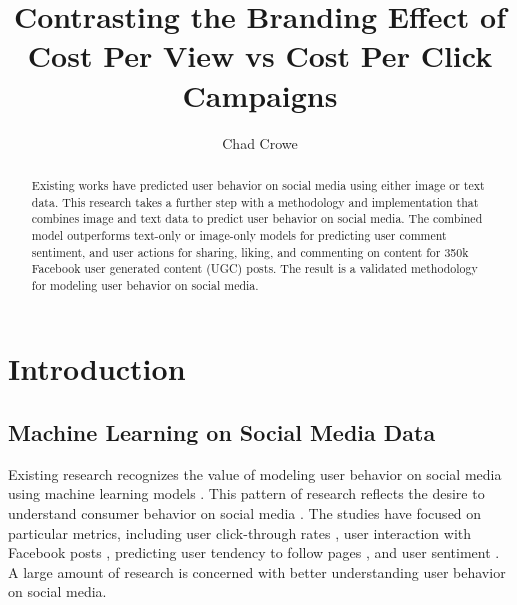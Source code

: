 \documentclass{article}
\begin{document}
\title{Contrasting the Branding Effect of Cost Per View vs Cost Per Click Campaigns}
\author{Chad Crowe}

\maketitle

\begin{abstract}

Existing works have predicted user behavior on social media using either image or text data. This research takes a further step with a methodology and implementation that combines image and text data to predict user behavior on social media.  The combined model outperforms text-only or image-only models for predicting user comment sentiment, and user actions for sharing, liking, and commenting on content for 350k Facebook user generated content (UGC) posts. The result is a validated methodology for modeling user behavior on social media.

\end{abstract}
  
\section{Introduction}

\subsection{Machine Learning on Social Media Data}

Existing research recognizes the value of modeling user behavior on social media using machine learning models \cite{Li2015, 8029313, Ohsawa2013, Liu2012, Li2015}. This pattern of research reflects the desire to understand consumer behavior on social media \cite{Fisher2009}. The studies have focused on particular metrics, including user click-through rates \cite{Li2015}, user interaction with Facebook posts \cite{8029313}, predicting user tendency to follow pages \cite{Ohsawa2013}, and user sentiment \cite{Liu2012,Wang2015}. A large amount of research is concerned with better understanding user behavior on social media.
\end{document}
